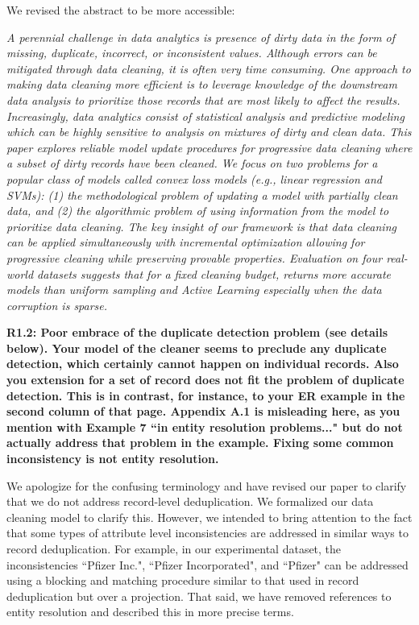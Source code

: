 We revised the abstract to be more accessible:

\emph{A perennial challenge in data analytics is presence of dirty data in the form of missing, duplicate, incorrect, or inconsistent values.
Although errors can be mitigated through data cleaning, it is often very time consuming.
One approach to making data cleaning more efficient is to leverage knowledge of the downstream data analysis to prioritize those records that are most likely to affect the results.
Increasingly, data analytics consist of statistical analysis and predictive modeling which can be highly sensitive to analysis on mixtures of dirty and clean data.
This paper explores reliable model update procedures for progressive data cleaning where a subset of dirty records have been cleaned.
We focus on two problems for a popular class of models called convex loss models (e.g., linear regression and SVMs): (1) the methodological problem of updating a model with partially clean data, and (2) the algorithmic problem of using information from the model to prioritize data cleaning.
The key insight of our framework is that data cleaning can be applied simultaneously with incremental optimization allowing for progressive cleaning while preserving provable properties.
Evaluation on four real-world datasets suggests that for a fixed cleaning budget, \sys returns more accurate models than uniform sampling and Active Learning especially when the data corruption is sparse. }

\vspace{0.5em}

\noindent\textbf{R1.2: Poor embrace of the duplicate detection problem (see details below). Your model of the cleaner seems to preclude any duplicate detection, which certainly cannot happen on individual records. Also you extension for a set of record does not fit the problem of duplicate detection. This is in contrast, for instance, to your ER example in the second column of that page. Appendix A.1 is misleading here, as you mention with Example 7 ``in entity resolution problems..." but do not actually address that problem in the example. Fixing some common inconsistency is not entity resolution.}

We apologize for the confusing terminology and have revised our paper to clarify that we do not address record-level deduplication.
We formalized our data cleaning model to clarify this.
However, we intended to bring attention to the fact that some types of attribute level inconsistencies are addressed in similar ways to record deduplication.
For example, in our experimental dataset, the inconsistencies ``Pfizer Inc.", ``Pfizer Incorporated", and ``Pfizer" can be addressed using a blocking and matching procedure similar to that used in record deduplication but over a projection.
That said, we have removed references to entity resolution and described this in more precise terms.

